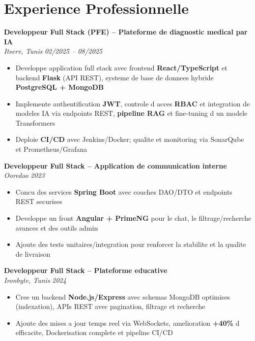 \documentclass[10pt,a4paper]{article}
\begin{document}
\vspace{6pt}

\section*{Experience Professionnelle}
{\small

\textbf{Developpeur Full Stack (PFE) -- Plateforme de diagnostic medical par IA}\\[1pt]
\textit{Itserv, Tunis} \hfill \textit{02/2025 -- 08/2025}
\begin{itemize}
  \item Developpe application full stack avec frontend \textbf{React/TypeScript} et backend \textbf{Flask} (API REST), systeme de base de donnees hybride \textbf{PostgreSQL + MongoDB}
  \item Implemente authentification \textbf{JWT}, controle d acces \textbf{RBAC} et integration de modeles IA via endpoints REST, \textbf{pipeline RAG} et fine-tuning d un modele Transformers
  \item Deploie \textbf{CI/CD} avec Jenkins/Docker; qualite et monitoring via SonarQube et Prometheus/Grafana
\end{itemize}

\vspace{3pt}
\textbf{Developpeur Full Stack -- Application de communication interne}\\[1pt]
\textit{Ooredoo} \hfill \textit{2023}
\begin{itemize}
  \item Concu des services \textbf{Spring Boot} avec couches DAO/DTO et endpoints REST securises
  \item Developpe un front \textbf{Angular + PrimeNG} pour le chat, le filtrage/recherche avances et des outils admin
  \item Ajoute des tests unitaires/integration pour renforcer la stabilite et la qualite de livraison
\end{itemize}

\vspace{3pt}
\textbf{Developpeur Full Stack -- Plateforme educative}\\[1pt]
\textit{Ironbyte, Tunis} \hfill \textit{2024}
\begin{itemize}
  \item Cree un backend \textbf{Node.js/Express} avec schemas MongoDB optimises (indexation), APIs REST avec pagination, filtrage et recherche
  \item Ajoute des mises a jour temps reel via WebSockets, amelioration \textbf{+40\%} d efficacite, Dockerisation complete et pipeline CI/CD
\end{itemize}

}
\end{document}
